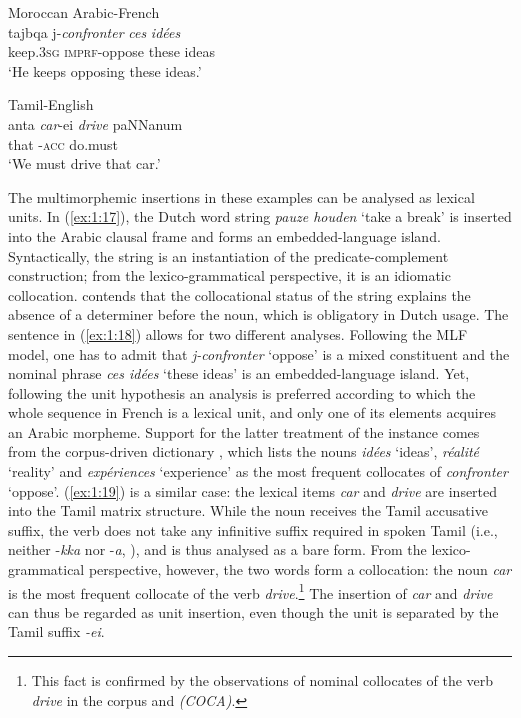 \ea \label{ex:1:18}
Moroccan Arabic-French \citep[315]{bentahila-davies-1983}\\
\gll tajbqa j-\textit{confronter} \textit{ces} \textit{idées}\\
keep.\textsc{3sg} \textsc{imprf}-oppose these ideas\\
\glt `He keeps opposing these ideas.'
\z

\ea \label{ex:1:19}
Tamil-English \citep[80]{sankoff-et-al-1990}\\
\gll anta  \textit{car}-ei \textit{drive} paNNanum\\
that { \hspace{4mm}-\textsc{acc}} {} do.must\\
\glt `We must drive that car.'
\z

\noindent The multimorphemic insertions in these examples can be analysed as lexical units. In (\ref{ex:1:17}), the Dutch word string \textit{pauze houden} `take a break' is inserted into the Arabic clausal frame and forms an embedded-language island. Syntactically, the string is an instantiation of the predicate-complement construction; from the lexico-grammatical perspective, it is an idiomatic collocation. \citet[246]{boumans-syntax-1998} contends that the collocational status of the string explains the absence of a determiner before the noun, which is obligatory in Dutch usage. The sentence in (\ref{ex:1:18}) allows for two different analyses. Following the MLF model, one has to admit that \textit{j-confronter} `oppose' is a mixed constituent and the nominal phrase \textit{ces id\'{e}es} `these ideas' is an embedded-language island. Yet, following the unit hypothesis an analysis is preferred according to which the whole sequence in French is a lexical unit, and only one of its elements acquires an Arabic morpheme. Support for the latter treatment of the instance comes from the corpus-driven dictionary , which lists the nouns \textit{idées} `ideas', \textit{réalité} `reality' and \textit{expériences} `experience' as the most frequent collocates of \textit{confronter} `oppose'. (\ref{ex:1:19}) is a similar case: the lexical items \textit{car} and \textit{drive} are inserted into the Tamil matrix structure. While the noun receives the Tamil accusative suffix, the verb does not take any infinitive suffix required in spoken Tamil (i.e., neither \mbox{-\textit{kka}} nor -\textit{a}, \citealt[cf.][73]{schiffman-tamil-1999}), and is thus analysed as a bare form. From the lexico-grammatical perspective, however, the two words form a collocation: the noun \textit{car} is the most frequent collocate of the verb \textit{drive}.\footnote{
This fact is confirmed by the observations of nominal collocates of the verb \textit{drive} in the  corpus and  \textit{(COCA)}.}
The insertion of \textit{car} and \textit{drive} can thus be regarded as unit insertion, even though the unit is separated by the Tamil suffix \textit{-ei}. 


